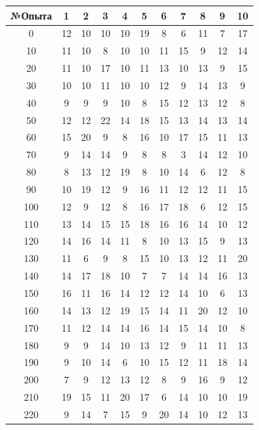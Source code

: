 \documentclass[a4paper, 12pt]{article}
\begin{document}
\begin{table}[!h]
\begin{center}
\begin{tabular}{|c|c|c|c|c|c|c|c|c|c|c|}
\hline
№Опыта & 1 & 2 & 3 & 4 & 5 & 6 & 7 & 8 & 9 & 10 \\ \hline 
0 & 12 & 10 & 10 & 10 & 19 & 8  & 6  & 11 & 7  & 17 \\ \hline
10 & 11 & 10 & 8  & 10 & 10 & 11 & 15 & 9  & 12 & 14 \\ \hline
20 & 11 & 10 & 17 & 10 & 11 & 13 & 10 & 13 & 9  & 15 \\ \hline
30 & 10 & 10 & 11 & 10 & 10 & 12 & 9  & 14 & 13 & 9  \\ \hline
40 & 9  & 9  & 9  & 10 & 8  & 15 & 12 & 13 & 12 & 8  \\ \hline
50 & 12 & 12 & 22 & 14 & 18 & 15 & 13 & 14 & 13 & 14 \\ \hline
60 & 15 & 20 & 9  & 8  & 16 & 10 & 17 & 15 & 11 & 13 \\ \hline
70 & 9  & 14 & 14 & 9  & 8  & 8  & 3  & 14 & 12 & 10 \\ \hline
80 & 8  & 13 & 12 & 19 & 8  & 10 & 14 & 6  & 12 & 8  \\ \hline
90 & 10 & 19 & 12 & 9  & 16 & 11 & 12 & 12 & 11 & 15 \\ \hline
100 & 12 & 9  & 12 & 8  & 16 & 17 & 18 & 6  & 12 & 15 \\ \hline
110 & 13 & 14 & 15 & 15 & 18 & 16 & 16 & 14 & 10 & 12 \\ \hline
120 & 14 & 16 & 14 & 11 & 8  & 10 & 13 & 15 & 9  & 13 \\ \hline
130 & 11 & 6  & 9  & 8  & 15 & 10 & 13 & 12 & 11 & 20 \\ \hline
140 & 14 & 17 & 18 & 10 & 7  & 7  & 14 & 14 & 16 & 13 \\ \hline
150 & 16 & 11 & 16 & 14 & 12 & 12 & 14 & 10 & 6  & 13 \\ \hline
160 & 14 & 13 & 12 & 19 & 15 & 14 & 11 & 20 & 12 & 10 \\ \hline
170 & 11 & 12 & 14 & 14 & 16 & 14 & 15 & 14 & 10 & 8  \\ \hline
180 & 9  & 9  & 14 & 10 & 13 & 12 & 9  & 11 & 11 & 13 \\ \hline
190 & 9  & 10 & 14 & 6  & 10 & 15 & 12 & 11 & 18 & 14 \\ \hline
200 & 7  & 9  & 12 & 13 & 12 & 8  & 9  & 16 & 9  & 12 \\ \hline
210 & 19 & 15 & 11 & 20 & 17 & 6  & 14 & 10 & 10 & 19 \\ \hline
220 & 9  & 14 & 7  & 15 & 9  & 20 & 14 & 10 & 12 & 13 \\ \hline

\end{tabular}
\end{center}
\end{table}
\end{document}
